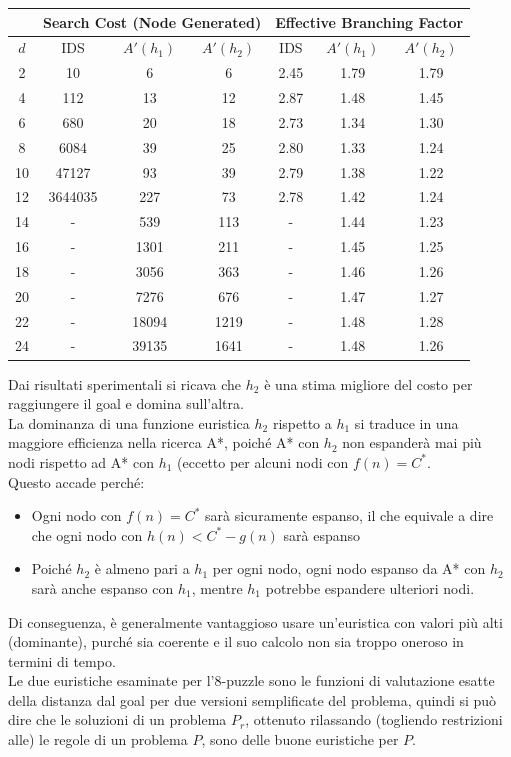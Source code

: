 \documentclass[../main.tex]{subfiles}
\begin{document}
	\begin{center}
		\begin{tabular}{ |c|c|c|c|c|c|c| }
			\hline
			\multicolumn{1}{|c|}{ } & \multicolumn{3}{|c|}{Search Cost (Node Generated)} & \multicolumn{3}{|c|}{Effective Branching Factor} \\
			\hline
			$d$ & IDS & $A'(h_1)$ & $A'(h_2)$ & IDS & $A'(h_1)$ & $A'(h_2)$\\
			\hline
			2 & 10 & 6 & 6 & 2.45 & 1.79 & 1.79\\
			\hline
			4 & 112 & 13 & 12 & 2.87 & 1.48 & 1.45\\
			\hline
			6 & 680 & 20 & 18 & 2.73 & 1.34 & 1.30\\
			\hline
			8 & 6084 & 39 & 25 & 2.80 & 1.33 & 1.24\\
			\hline
			10 & 47127 & 93 & 39 & 2.79 & 1.38 & 1.22\\
			\hline
			12 & 3644035 & 227 & 73 & 2.78 & 1.42 & 1.24\\
			\hline
			14 & - & 539 & 113 & - & 1.44 & 1.23\\
			\hline
			16 & - & 1301 & 211 & -& 1.45 & 1.25\\
			\hline
			18 & - & 3056 & 363 & - & 1.46 & 1.26\\
			\hline
			20 & - & 7276 & 676 & - & 1.47 & 1.27\\
			\hline
			22 & - & 18094 & 1219 & - & 1.48 & 1.28\\
			\hline
			24 & - & 39135 & 1641 & - & 1.48 & 1.26\\
			\hline
		\end{tabular}
	\end{center}
	Dai risultati sperimentali si ricava che $h_2$ è una stima migliore del costo per raggiungere il goal e domina sull'altra.\\
	La dominanza di una funzione euristica $h_2$ rispetto a $h_1$ si traduce in una maggiore efficienza nella ricerca A*, poiché A* con $h_2$ non espanderà mai più nodi rispetto ad A* con $h_1$ (eccetto per alcuni nodi con $f(n)=C^*$.\\
	Questo accade perché:
	\begin{itemize}
		\item Ogni nodo con $f(n)=C^*$ sarà sicuramente espanso, il che equivale a dire che ogni nodo con $h(n) <C^*-g(n)$ sarà espanso
		\item Poiché $h_2$ è almeno pari a $h_1$ per ogni nodo, ogni nodo espanso da A* con $h_2$ sarà anche espanso con $h_1$, mentre $h_1$ potrebbe espandere ulteriori nodi.
	\end{itemize}
	Di conseguenza, è generalmente vantaggioso usare un'euristica con valori più alti (dominante), purché sia coerente e il suo calcolo non sia troppo oneroso in termini di tempo.\\
	Le due euristiche esaminate per l'8-puzzle sono le funzioni di valutazione esatte della distanza dal goal per due versioni semplificate del problema, quindi si può dire che le soluzioni di un problema $P_r$, ottenuto rilassando (togliendo restrizioni alle) le regole di un problema $P$, sono delle buone euristiche per $P$.
\end{document}
